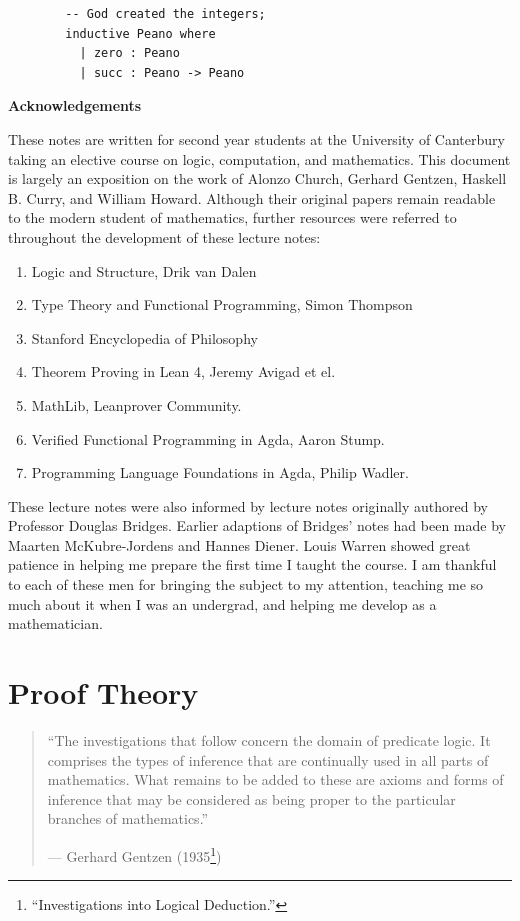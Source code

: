 \documentclass{book}
\begin{document}
    \begin{lstlisting}
        -- God created the integers;
        inductive Peano where
          | zero : Peano
          | succ : Peano -> Peano
    \end{lstlisting} 
    


    \newpage
    {\bf Acknowledgements} 

    These notes are written for second year students at the University of Canterbury taking an elective course on logic, computation, and mathematics. This document is largely an exposition on the work of Alonzo Church, Gerhard Gentzen, Haskell B. Curry, and William Howard. Although their original papers remain readable to the modern student of mathematics, further resources were referred to throughout the development of these lecture notes:

        \begin{enumerate}
            \item Logic and Structure, Drik van Dalen \cite{vDalen}
            \item Type Theory and Functional Programming, Simon Thompson \cite{thompson}
            \item Stanford Encyclopedia of Philosophy
            \item Theorem Proving in Lean 4, Jeremy Avigad et el.
            \item MathLib, Leanprover Community. 
            \item Verified Functional Programming in Agda, Aaron Stump.
            \item Programming Language Foundations in Agda, Philip Wadler. 
        \end{enumerate}    
    
    These lecture notes were also informed by lecture notes originally authored by Professor Douglas Bridges. Earlier adaptions of Bridges' notes had been made by Maarten McKubre-Jordens and Hannes Diener. Louis Warren showed great patience in helping me prepare the first time I taught the course. I am thankful to each of these men for bringing the subject to my attention, teaching me so much about it when I was an undergrad, and helping me develop as a mathematician. 

\chapter{Proof Theory}

\begin{quote}
    ``The investigations that follow concern the domain of predicate logic. It comprises the types of inference that are continually used in all parts of mathematics. What remains to be added to these are axioms and forms of inference that may be considered as being proper to the particular branches of mathematics.''
    \begin{flushright}
        --- Gerhard Gentzen (1935\footnote{``Investigations into Logical Deduction.''})
    \end{flushright}
\end{quote}
\end{document}
